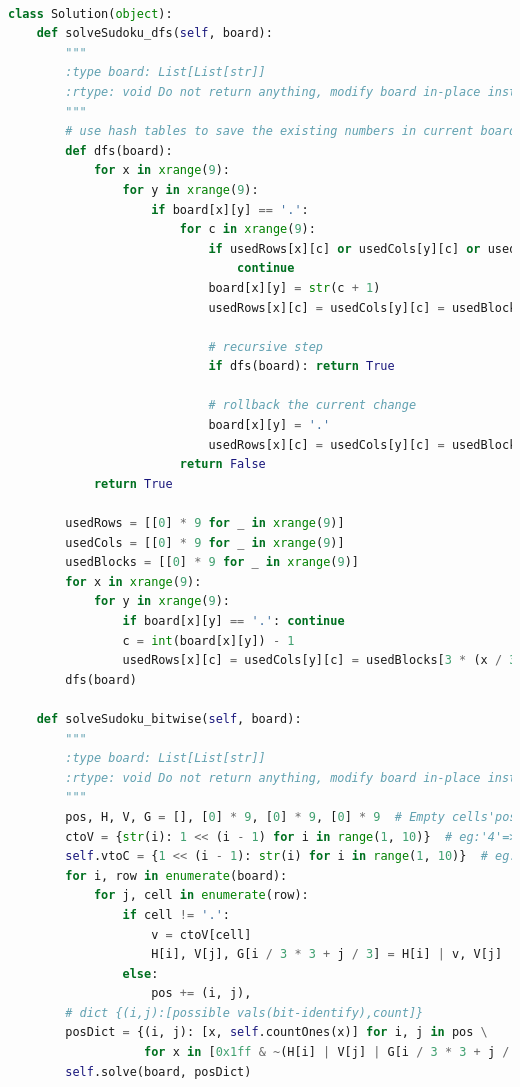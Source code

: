 \documentclass[a4paper,10pt]{article}
\begin{document}
\begin{lstlisting}[language=Python, caption=Problem37. Sudoku Solver]

class Solution(object):
    def solveSudoku_dfs(self, board):
        """
        :type board: List[List[str]]
        :rtype: void Do not return anything, modify board in-place instead.
        """
        # use hash tables to save the existing numbers in current board
        def dfs(board):
            for x in xrange(9):
                for y in xrange(9):
                    if board[x][y] == '.':
                        for c in xrange(9):
                            if usedRows[x][c] or usedCols[y][c] or usedBlocks[3 * (x / 3) + (y / 3)][c]:
                                continue
                            board[x][y] = str(c + 1)
                            usedRows[x][c] = usedCols[y][c] = usedBlocks[3 * (x / 3) + (y / 3)][c] = True

                            # recursive step
                            if dfs(board): return True

                            # rollback the current change
                            board[x][y] = '.'
                            usedRows[x][c] = usedCols[y][c] = usedBlocks[3 * (x / 3) + (y / 3)][c] = False
                        return False
            return True

        usedRows = [[0] * 9 for _ in xrange(9)]
        usedCols = [[0] * 9 for _ in xrange(9)]
        usedBlocks = [[0] * 9 for _ in xrange(9)]
        for x in xrange(9):
            for y in xrange(9):
                if board[x][y] == '.': continue
                c = int(board[x][y]) - 1
                usedRows[x][c] = usedCols[y][c] = usedBlocks[3 * (x / 3) + (y / 3)][c] = True
        dfs(board)

    def solveSudoku_bitwise(self, board):
        """
        :type board: List[List[str]]
        :rtype: void Do not return anything, modify board in-place instead.
        """
        pos, H, V, G = [], [0] * 9, [0] * 9, [0] * 9  # Empty cells'position,horizontal,vertical,grid
        ctoV = {str(i): 1 << (i - 1) for i in range(1, 10)}  # eg:'4'=>1000
        self.vtoC = {1 << (i - 1): str(i) for i in range(1, 10)}  # eg:100=>'3'
        for i, row in enumerate(board):
            for j, cell in enumerate(row):
                if cell != '.':
                    v = ctoV[cell]
                    H[i], V[j], G[i / 3 * 3 + j / 3] = H[i] | v, V[j] | v, G[i / 3 * 3 + j / 3] | v
                else:
                    pos += (i, j),
        # dict {(i,j):[possible vals(bit-identify),count]}
        posDict = {(i, j): [x, self.countOnes(x)] for i, j in pos \
                   for x in [0x1ff & ~(H[i] | V[j] | G[i / 3 * 3 + j / 3])]}
        self.solve(board, posDict)


\end{lstlisting}
\end{document}
